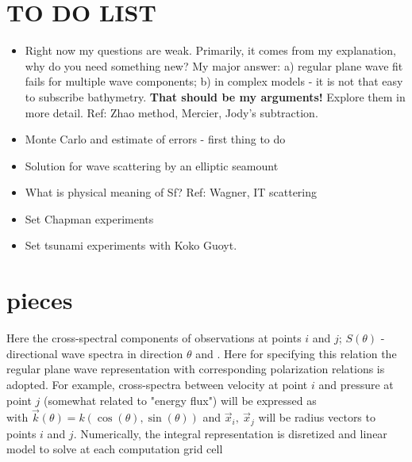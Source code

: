\section{TO DO LIST}
\begin{itemize}
\item Right now my questions are weak. Primarily, it comes from my explanation, why do you need something new? My major answer: a) regular plane wave fit fails for multiple wave components; b) in complex models - it is not that easy to subscribe bathymetry. \textbf{That should be my arguments!} Explore them in more detail. Ref: Zhao method, Mercier, Jody's subtraction.

\item Monte Carlo and estimate of errors - first thing to do

\item Solution for wave scattering by an elliptic seamount

\item What is physical meaning of Sf? Ref: Wagner, IT scattering

\item Set Chapman experiments

\item Set tsunami experiments with Koko Guoyt.
\end{itemize}
\section{pieces}
Here the cross-spectral components of observations at points $i$ and $j$; $S(\theta)$ - directional wave spectra in direction $\theta$ and . Here for specifying this relation the regular plane wave representation with corresponding polarization relations is adopted. For example, cross-spectra between velocity at point $i$ and pressure at point $j$ (somewhat related to "energy flux") will be expressed as\\

with $\vec{k}(\theta) = k (\cos(\theta), \sin (\theta))$ and $\vec{x}_i,~\vec{x}_j$ will be radius vectors to points $i$ and $j$. Numerically, the integral representation is disretized and linear model to solve at each computation grid cell\\

